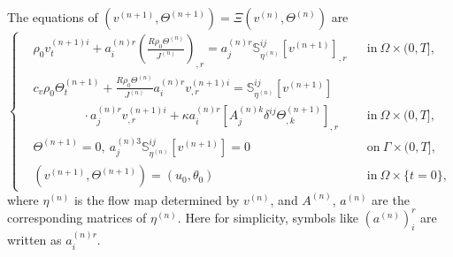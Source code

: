 \documentclass[12pt,a4paper]{amsart}
\numberwithin{equation}{section}
\theoremstyle{plain}
\theoremstyle{definition}
\begin{document}
\vspace{0.3cm}
The equations of $(v^{(n+1)},\Theta^{(n+1)})=\Xi(v^{(n)},\Theta^{(n)})$ are
\begin{equation} \label{*(n+1)} \tag{*(n+1)}
\left\{\begin{aligned}
&\rho_0v^{(n+1)i}_t+a^{(n)r}_i(\frac{R\rho_0 \Theta^{(n)}}{J^{(n)}})_{,r} = a^{(n)r}_j\mathbb{S}^{ij}_{\eta^{(n)}}[v^{(n+1)}]_{,r} &&\text{in}~ \Omega\times(0,T],\\
&c_v \rho_0\Theta^{(n+1)}_t +\frac{R\rho_0\Theta^{(n)}}{J^{(n)}}a^{(n)r}_iv^{(n+1)i}_{,r}= \mathbb{S}^{ij}_{\eta^{(n)}}[v^{(n+1)}] \\
&\qquad\qquad \cdot a^{(n)r}_jv^{(n+1)i}_{,r}
+\kappa a^{(n)r}_i [A^{(n)k}_j \delta^{ij} \Theta^{(n+1)}_{,k}]_{,r}&&\text{in}~ \Omega\times(0,T],\\
&\Theta^{(n+1)}=0,~a^{(n)3}_j\mathbb{S}^{ij}_{\eta^{(n)}}[v^{(n+1)}]=0&&\text{on}~ \Gamma\times(0,T],\\
&(v^{(n+1)},\Theta^{(n+1)})=(u_0,\theta_0) &&\text{in}~ \Omega\times\{t=0\},
\end{aligned}
\right.
\end{equation}
where $\eta^{(n)}$ is the flow map determined by $v^{(n)}$, and $A^{(n)}$, $a^{(n)}$ are the corresponding matrices of $\eta^{(n)}$. Here for simplicity, symbols like   $(a^{(n)})^r_i$ are written as $a^{(n)r}_i$.
\end{document}
